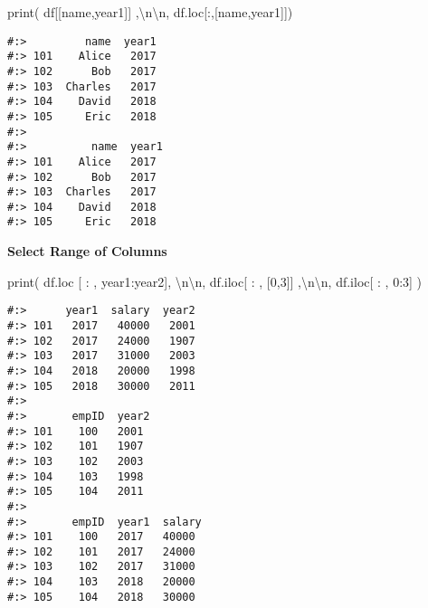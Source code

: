 \documentclass[
]{book}
\newenvironment{Shaded}{\begin{snugshade}}{\end{snugshade}}
\newcommand{\BuiltInTok}[1]{#1}
\newcommand{\CharTok}[1]{\textcolor[rgb]{0.5,0.5,0.5}{#1}}
\newcommand{\DecValTok}[1]{\textcolor[rgb]{0.06,0.06,0.06}{#1}}
\newcommand{\NormalTok}[1]{#1}
\newcommand{\StringTok}[1]{\textcolor[rgb]{0.5,0.5,0.5}{#1}}
\begin{document}
\begin{Shaded}
\begin{Highlighting}[]
\BuiltInTok{print}\NormalTok{(}
\NormalTok{  df[[}\StringTok{\textquotesingle{}name\textquotesingle{}}\NormalTok{,}\StringTok{\textquotesingle{}year1\textquotesingle{}}\NormalTok{]]       ,}\StringTok{\textquotesingle{}}\CharTok{\textbackslash{}n\textbackslash{}n}\StringTok{\textquotesingle{}}\NormalTok{,}
\NormalTok{  df.loc[:,[}\StringTok{\textquotesingle{}name\textquotesingle{}}\NormalTok{,}\StringTok{\textquotesingle{}year1\textquotesingle{}}\NormalTok{]])}
\end{Highlighting}
\end{Shaded}

\begin{verbatim}
#:>         name  year1
#:> 101    Alice   2017
#:> 102      Bob   2017
#:> 103  Charles   2017
#:> 104    David   2018
#:> 105     Eric   2018 
#:> 
#:>          name  year1
#:> 101    Alice   2017
#:> 102      Bob   2017
#:> 103  Charles   2017
#:> 104    David   2018
#:> 105     Eric   2018
\end{verbatim}

\textbf{Select Range of Columns}

\begin{Shaded}
\begin{Highlighting}[]
\BuiltInTok{print}\NormalTok{(}
\NormalTok{  df.loc [ : , }\StringTok{\textquotesingle{}year1\textquotesingle{}}\NormalTok{:}\StringTok{\textquotesingle{}year2\textquotesingle{}}\NormalTok{], }\StringTok{\textquotesingle{}}\CharTok{\textbackslash{}n\textbackslash{}n}\StringTok{\textquotesingle{}}\NormalTok{,}
\NormalTok{  df.iloc[ : , [}\DecValTok{0}\NormalTok{,}\DecValTok{3}\NormalTok{]]           ,}\StringTok{\textquotesingle{}}\CharTok{\textbackslash{}n\textbackslash{}n}\StringTok{\textquotesingle{}}\NormalTok{,}
\NormalTok{  df.iloc[ : , }\DecValTok{0}\NormalTok{:}\DecValTok{3}\NormalTok{]}
\NormalTok{)}
\end{Highlighting}
\end{Shaded}

\begin{verbatim}
#:>      year1  salary  year2
#:> 101   2017   40000   2001
#:> 102   2017   24000   1907
#:> 103   2017   31000   2003
#:> 104   2018   20000   1998
#:> 105   2018   30000   2011 
#:> 
#:>       empID  year2
#:> 101    100   2001
#:> 102    101   1907
#:> 103    102   2003
#:> 104    103   1998
#:> 105    104   2011 
#:> 
#:>       empID  year1  salary
#:> 101    100   2017   40000
#:> 102    101   2017   24000
#:> 103    102   2017   31000
#:> 104    103   2018   20000
#:> 105    104   2018   30000
\end{verbatim}
\end{document}

